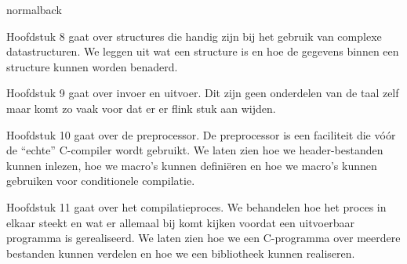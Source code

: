 \documentclass[spinewidth=10.44mm]{bookcover}
\begin{document}
\begin{bookcover}
\begin{bookcoverelement}{normal}{back}
{Hoofdstuk 8 gaat over structures die handig zijn bij het gebruik van complexe datastructuren. We leggen uit wat een structure is en hoe de gegevens binnen een structure kunnen worden benaderd. 

Hoofdstuk 9 gaat over invoer en uitvoer. Dit zijn geen onderdelen van de taal zelf maar komt zo vaak voor dat er er flink stuk aan wijden.

Hoofdstuk 10 gaat over de preprocessor. De preprocessor is een faciliteit die vóór de ``echte'' C-compiler wordt gebruikt. We laten zien hoe we header-bestanden kunnen inlezen, hoe we macro's kunnen definiëren en hoe we macro's kunnen gebruiken voor conditionele compilatie.

Hoofdstuk 11 gaat over het compilatieproces. We behandelen hoe het proces in elkaar steekt en wat er allemaal bij komt kijken voordat een uitvoerbaar programma is gerealiseerd. We laten zien hoe we een C-programma over meerdere bestanden kunnen verdelen en hoe we een bibliotheek kunnen realiseren.
}
\vfill
\end{bookcoverelement}
\end{bookcover}
\end{document}
